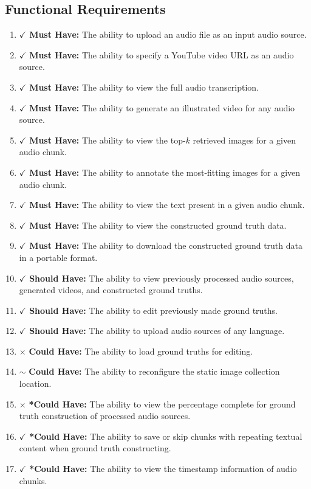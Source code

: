 \documentclass{l4proj}
\begin{document}
\subsection{Functional Requirements}
\begin{enumerate}
    \item {\color{forestgreen} $\checkmark$ \textbf{Must Have:} The ability to upload an audio file as an input audio source.}
    \item {\color{forestgreen} $\checkmark$ \textbf{Must Have:} The ability to specify a YouTube video URL as an audio source.}
    \item {\color{forestgreen} $\checkmark$ \textbf{Must Have:} The ability to view the full audio transcription.}
    \item {\color{forestgreen} $\checkmark$ \textbf{Must Have:} The ability to generate an illustrated video for any audio source.}
    \item {\color{forestgreen} $\checkmark$ \textbf{Must Have:} The ability to view the top-$k$ retrieved images for a given audio chunk.}
    \item {\color{forestgreen} $\checkmark$ \textbf{Must Have:} The ability to annotate the most-fitting images for a given audio chunk.}
    \item {\color{forestgreen} $\checkmark$ \textbf{Must Have:} The ability to view the text present in a given audio chunk.}
    \item {\color{forestgreen} $\checkmark$ \textbf{Must Have:} The ability to view the constructed ground truth data.}
    \item {\color{forestgreen} $\checkmark$ \textbf{Must Have:} The ability to download the constructed ground truth data in a portable format.}
    \item {\color{forestgreen} $\checkmark$ \textbf{Should Have:} The ability to view previously processed audio sources, generated videos, and constructed ground truths.}
    \item {\color{forestgreen} $\checkmark$ \textbf{Should Have:} The ability to edit previously made ground truths.}
    \item {\color{forestgreen} $\checkmark$ \textbf{Should Have:} The ability to upload audio sources of any language.}
    \item \label{reqs:13} {\color{brickred} $\times$ \textbf{Could Have:} The ability to load ground truths for editing.}
    \item \label{reqs:14} {\color{golden} $\sim$ \textbf{Could Have:} The ability to reconfigure the static image collection location.}
    \item \label{reqs:15} {\color{brickred} $\times$ \textbf{*Could Have:} The ability to view the percentage complete for ground truth construction of processed audio sources.}
    \item {\color{forestgreen} $\checkmark$ \textbf{*Could Have:} The ability to save or skip chunks with repeating textual content when ground truth constructing.}
    \item {\color{forestgreen} $\checkmark$ \textbf{*Could Have:} The ability to view the timestamp information of audio chunks.}
\end{enumerate}
\end{document}
